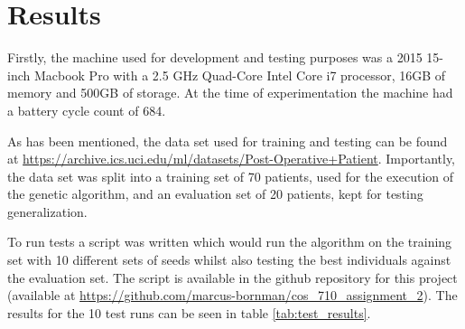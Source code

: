 \section{Results}
Firstly, the machine used for development and testing purposes was a 2015 15-inch Macbook Pro with a 2.5 GHz Quad-Core Intel Core i7 processor, 16GB of memory and 500GB of storage. At the time of experimentation the machine had a battery cycle count of 684.

As has been mentioned, the data set used for training and testing can be found at \url{https://archive.ics.uci.edu/ml/datasets/Post-Operative+Patient}. Importantly, the data set was split into a training set of 70 patients, used for the execution of the genetic algorithm, and an evaluation set of 20 patients, kept for testing generalization.

To run tests a script was written which would run the algorithm on the training set with 10 different sets of seeds whilst also testing the best individuals against the evaluation set. The script is available in the github repository for this project (available at \url{https://github.com/marcus-bornman/cos_710_assignment_2}). The results for the 10 test runs can be seen in table \ref{tab:test_results}.


